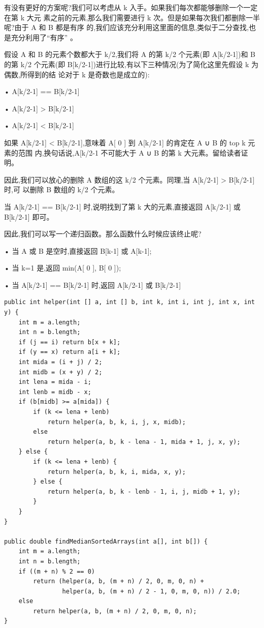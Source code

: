 \documentclass[12pt]{book}
\begin{document}
有没有更好的方案呢?我们可以考虑从 k 入手。如果我们每次都能够删除一个一定在第 k 大元
素之前的元素,那么我们需要进行 k 次。但是如果每次我们都删除一半呢?由于 A 和 B 都是有序
的,我们应该充分利用这里面的信息,类似于二分查找,也是充分利用了“有序”
。

假设 A 和 B 的元素个数都大于 k/2,我们将 A 的第 k/2 个元素(即 A[k/2-1])和 B 的第 k/2
个元素(即 B[k/2-1])进行比较,有以下三种情况(为了简化这里先假设 k 为偶数,所得到的结
论对于 k 是奇数也是成立的):

• A[k/2-1] == B[k/2-1]

• A[k/2-1] > B[k/2-1]

• A[k/2-1] < B[k/2-1]

如果 A[k/2-1] < B[k/2-1],意味着 A[ 0 ] 到 A[k/2-1] 的肯定在 A ∪ B 的 top k 元素的范围
内,换句话说,A[k/2-1 不可能大于 A ∪ B 的第 k 大元素。留给读者证明。

因此,我们可以放心的删除 A 数组的这 k/2 个元素。同理,当 A[k/2-1] > B[k/2-1] 时,可
以删除 B 数组的 k/2 个元素。

当 A[k/2-1] == B[k/2-1] 时,说明找到了第 k 大的元素,直接返回 A[k/2-1] 或 B[k/2-1]
即可。

因此,我们可以写一个递归函数。那么函数什么时候应该终止呢?

• 当 A 或 B 是空时,直接返回 B[k-1] 或 A[k-1];


• 当 k=1 是,返回 min(A[ 0 ], B[ 0 ]);

• 当 A[k/2-1] == B[k/2-1] 时,返回 A[k/2-1] 或 B[k/2-1]

\lstset{language=java,label= ,caption= ,numbers=none}
\begin{lstlisting}
public int helper(int [] a, int [] b, int k, int i, int j, int x, int y) {
    int m = a.length;
    int n = b.length;
    if (j == i) return b[x + k];
    if (y == x) return a[i + k];
    int mida = (i + j) / 2;
    int midb = (x + y) / 2;
    int lena = mida - i;
    int lenb = midb - x;
    if (b[midb] >= a[mida]) {
        if (k <= lena + lenb) 
            return helper(a, b, k, i, j, x, midb);
        else
            return helper(a, b, k - lena - 1, mida + 1, j, x, y);
    } else {
        if (k <= lena + lenb) {
            return helper(a, b, k, i, mida, x, y);
        } else {
            return helper(a, b, k - lenb - 1, i, j, midb + 1, y);
        }
    }
}

public double findMedianSortedArrays(int a[], int b[]) {
    int m = a.length;
    int n = b.length;
    if ((m + n) % 2 == 0)
        return (helper(a, b, (m + n) / 2, 0, m, 0, n) +
                helper(a, b, (m + n) / 2 - 1, 0, m, 0, n)) / 2.0;
    else
        return helper(a, b, (m + n) / 2, 0, m, 0, n);
}
\end{lstlisting}
\end{document}
